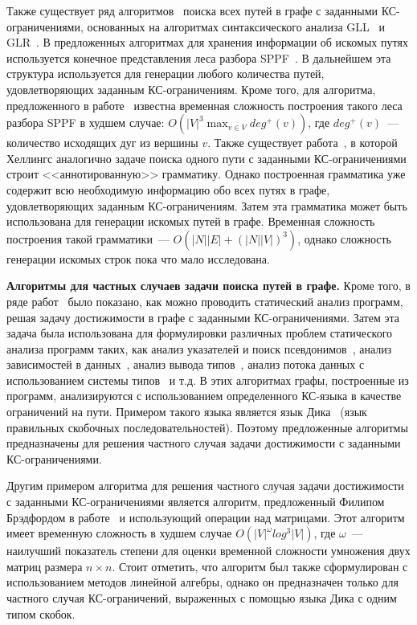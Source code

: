 Также существует ряд алгоритмов~\cite{grigorev2017context, verbitskaia2015relaxed, verbitskaia2018parser} поиска всех путей в графе с заданными КС-ограничениями, основанных на алгоритмах синтаксического анализа GLL~\cite{scott2010gll} и GLR~\cite{scott2007brnglr}. В предложенных алгоритмах для хранения информации об искомых путях используется конечное представления леса разбора SPPF~\cite{tomita1984lr}. В дальнейшем эта структура используется для генерации любого количества путей, удовлетворяющих заданным КС-ограничениям. Кроме того, для алгоритма, предложенного в работе~\cite{grigorev2017context} известна временная сложность построения такого леса разбора SPPF в худшем случае: $O(|V|^3 \max_{v \in V} deg^+(v))$, где $deg^+(v)$~--- количество исходящих дуг из вершины $v$. Также существует работа~\cite{hellings2015querying}, в которой Хеллингс аналогично задаче поиска одного пути с заданными КС-ограничениями строит <<аннотированную>> грамматику. Однако построенная грамматика уже содержит всю необходимую информацию обо всех путях в графе, удовлетворяющих заданным КС-ограничениям. Затем эта грамматика может быть использована для генерации искомых путей в графе. Временная сложность построения такой грамматики~--- $O(|N||E| + (|N||V|)^3)$, однако сложность генерации искомых строк пока что мало исследована.

\textbf{Алгоритмы для  частных случаев задачи поиска путей в графе.} Кроме того, в ряде работ~\cite{horwitz1995demand,reps1998program,reps1995precise} было показано, как можно проводить статический анализ программ, решая задачу достижимости в графе с заданными КС-ограничениями. Затем эта задача была использована для формулировки различных проблем статического анализа программ таких, как анализ указателей и поиск псевдонимов~\cite{chatterjee2017optimal,dietrich2015giga,lu2013incremental, sridharan2005demand,yan2011demand,zheng2008demand}, анализ зависимостей в данных~\cite{chatterjee2017optimal}, анализ вывода типов~\cite{milanova2014cfl}, анализ потока данных с использованием системы типов~\cite{rehof2001type} и т.д. В этих алгоритмах графы, построенные из программ, анализируются с использованием определенного КС-языка в качестве ограничений на пути. Примером такого языка является язык Дика~\cite{reps1998program} (язык правильных скобочных последовательностей). Поэтому предложенные алгоритмы предназначены для решения частного случая задачи достижимости с заданными КС-ограничениями.

Другим примером алгоритма для решения частного случая задачи достижимости с заданными КС-ограничениями является алгоритм, предложенный Филипом Брэдфордом в работе~\cite{bradford2017efficient} и использующий операции над матрицами. Этот алгоритм имеет временную сложность в худшем случае $O(|V|^{\omega} log^3 |V|)$, где $\omega$~--- наилучший показатель степени для оценки временной сложности умножения двух матриц размера $n \times n$. Стоит отметить, что алгоритм был также сформулирован с использованием методов линейной алгебры, однако он предназначен только для частного случая КС-ограничений, выраженных с помощью языка Дика с одним типом скобок.

